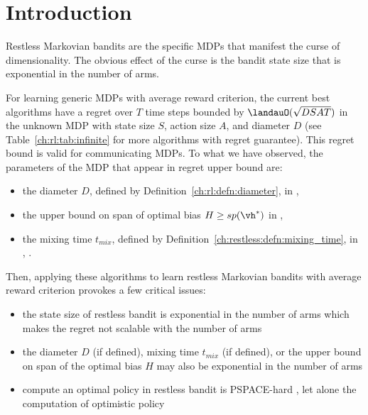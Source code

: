 \section{Introduction}
\label{ch:restless:related}

Restless Markovian bandits are the specific MDPs that manifest the curse of dimensionality.
The obvious effect of the curse is the bandit state size that is exponential in the number of arms.

For learning generic MDPs with average reward criterion, the current best algorithms have a regret over $T$ time steps bounded by $\landauO(\sqrt{DSAT})$ in the unknown MDP with state size $S$, action size $A$, and diameter $D$ (see Table~\ref{ch:rl:tab:infinite} for more algorithms with regret guarantee).
This regret bound is valid for communicating MDPs.
To what we have observed, the parameters of the MDP that appear in regret upper bound are:
\begin{itemize}
    \item the diameter $D$, defined by Definition~\ref{ch:rl:defn:diameter}, in \eg, \cite{jaksch2010near, fruit2020improved, tossou2019near}
    \item the upper bound on span of optimal bias $H\ge sp(\vh^*)$ in \eg, \cite{bartlett2012regal, ouyang2017learning, fruit2018efficient, zhang2019regret}
    \item the mixing time $t_{mix}$, defined by Definition~\ref{ch:restless:defn:mixing_time}, in \eg, \cite{ortner2020regret}.
\end{itemize}
Then, applying these algorithms to learn restless Markovian bandits with average reward criterion provokes a few critical issues:
\begin{itemize}
    \item the state size of restless bandit is exponential in the number of arms which makes the regret not scalable with the number of arms
    \item the diameter $D$ (if defined), mixing time $t_{mix}$ (if defined), or the upper bound on span of the optimal bias $H$ may also be exponential in the number of arms
    \item compute an optimal policy in restless bandit is PSPACE-hard \cite{papadimitriou1994complexity}, let alone the computation of optimistic policy
\end{itemize}

